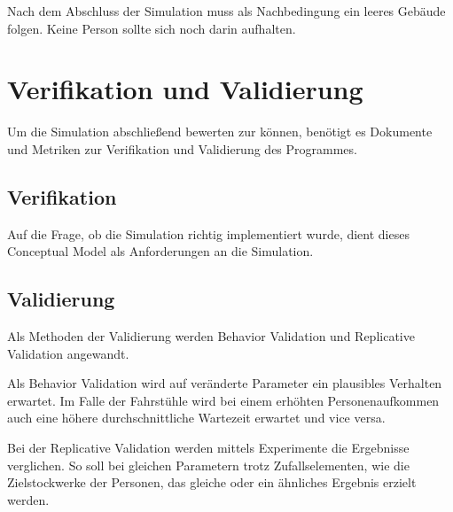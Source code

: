 \documentclass[envcountsame, envcountchap, deutsch]{i-studis}
\begin{document}
Nach dem Abschluss der Simulation muss als Nachbedingung ein leeres
Gebäude folgen. Keine Person sollte sich noch darin aufhalten.

\hypertarget{verifikation-und-validierung}{%
\chapter{Verifikation und
Validierung}\label{verifikation-und-validierung}}

Um die Simulation abschließend bewerten zur können, benötigt es
Dokumente und Metriken zur Verifikation und Validierung des Programmes.

\hypertarget{verifikation}{%
\section{Verifikation}\label{verifikation}}

Auf die Frage, ob die Simulation richtig implementiert wurde, dient
dieses Conceptual Model als Anforderungen an die Simulation.

\hypertarget{validierung}{%
\section{Validierung}\label{validierung}}

Als Methoden der Validierung werden Behavior Validation und Replicative
Validation angewandt.

Als Behavior Validation wird auf veränderte Parameter ein plausibles
Verhalten erwartet. Im Falle der Fahrstühle wird bei einem erhöhten
Personenaufkommen auch eine höhere durchschnittliche Wartezeit erwartet
und vice versa.

Bei der Replicative Validation werden mittels Experimente die Ergebnisse
verglichen. So soll bei gleichen Parametern trotz Zufallselementen, wie
die Zielstockwerke der Personen, das gleiche oder ein ähnliches Ergebnis
erzielt werden.




\end{document}
